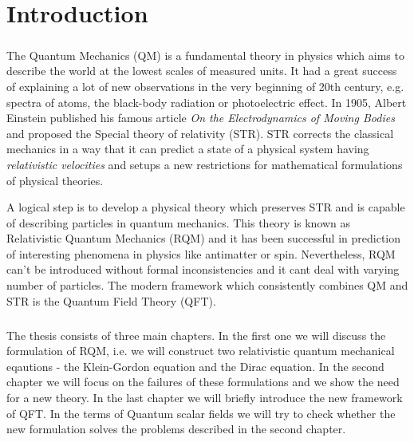 \chapter*{Introduction}

\paragraph{} The Quantum Mechanics (QM) is a fundamental theory in physics which aims to describe
the world at the lowest scales of measured units. It had a great success of explaining
a lot of new observations in the very beginning of 20th century, e.g. spectra of atoms,
the black-body radiation or photoelectric effect. In 1905, Albert Einstein published his
famous article \textit{On the Electrodynamics of Moving Bodies} and proposed the Special 
theory of relativity (STR). STR corrects the classical mechanics in a way that it can predict
a state of a physical system having \textit{relativistic velocities} and setups a 
new restrictions for mathematical formulations of physical theories.

A logical step is to develop a physical theory which preserves STR and is capable of 
describing particles in quantum mechanics. This theory is known as Relativistic Quantum 
Mechanics (RQM) and it has been successful in prediction of interesting phenomena in physics
like antimatter or spin. Nevertheless, RQM can't be introduced without formal inconsistencies
and it cant deal with varying number of particles. The modern framework which consistently 
combines QM and STR is the Quantum Field Theory (QFT).

\paragraph{} The thesis consists of three main chapters. In the first one we will discuss the formulation
of RQM, i.e. we will construct two relativistic quantum mechanical eqautions - the Klein-Gordon 
equation and the Dirac equation. In the second chapter we will focus on the failures of these 
formulations and we show the need for a new theory. In the last chapter we will briefly introduce
the new framework of QFT. In the terms of Quantum scalar fields we will try to check whether
the new formulation solves the problems described in the second chapter.
